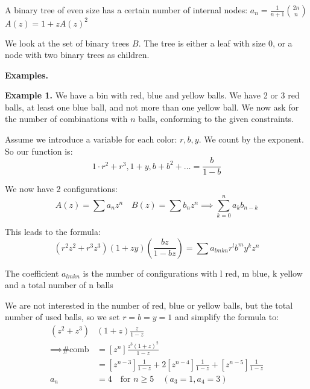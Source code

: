 


A binary tree of even size has a certain number of internal nodes: $\displaystyle{a_n = \frac{1}{n+1} {2n \choose n}}$\\
$A(z) = 1 + zA(z)^2$

We look at the set of binary trees $B$. The tree is either a leaf with size 0, or a node with two binary trees as children.

\textbf{Examples.}

\textbf{Example 1.}
We have a bin with red, blue and yellow balls. We have 2 or 3 red balls, at least one blue ball, and not more than one yellow ball. We now ask for the number of combinations with $n$ balls, conforming to the given constraints.

Assume we introduce a variable for each color: $r,b,y$. We count by the exponent. So our function is:
\[
    1\cdot r^2 + r^3,  1+y, b + b^2 + \ldots = \frac{b}{1-b}
\]

We now have 2 configurations:
\[
    A(z) = \sum a_n z^n \quad
    B(z) = \sum b_n z^n
    \implies \sum_{k=0}^{n} a_k b_{n-k}
\]

This leads to the formula:
\[
    (r^2  z^2+ r^3 z^3) (1+zy) \left(\frac{bz}{1-bz}\right)
    = \sum a_{lmkn} r^l b^m y^k z^n
\]

The coefficient $a_{lmkn}$ is the number of configurations with l red, m blue, k yellow and a total number of n balls

We are not interested in the number of red, blue or yellow balls, but the total number of used balls, so we set $r=b=y=1$ and simplify the formula to:
\begin{align*}
    (z^2 + z^3)&(1+z) \frac{z}{1-z} \\
    \implies \text{\# comb}
    &= \left[z^n\right] \frac{z^3(1+z)^2}{1-z} \\
    &= \left[z^{n-3}\right] \frac{1}{1-z}+ 2\left[z^{n-4}\right] \frac{1}{1-z} + \left[z^{n-5}\right] \frac{1}{1-z} \\
    a_n &= 4 \quad \text{for } n ≥ 5 \quad (a_3=1, a_4=3)
\end{align*}

